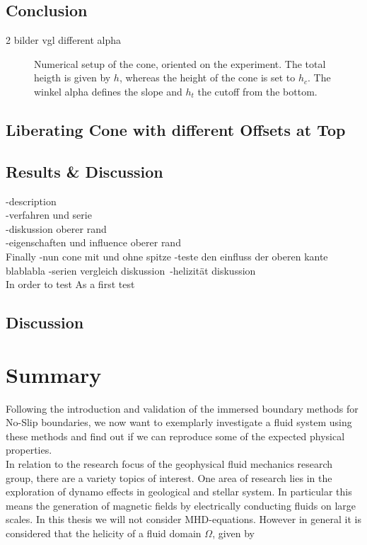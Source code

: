\subsection{Conclusion}
2 bilder vgl different alpha

\begin{figure}[!bp]
      \centering
      \caption{Numerical setup of the cone, oriented on the experiment. The total heigth
         is given by $h$, whereas the height of the cone is set to $h_c$.
      The winkel alpha defines the slope and $h_t$ the cutoff from the bottom.}
      \label{cone:theorie}
\end{figure}


\clearpage

\subsection{Liberating Cone with different Offsets at Top}
\subsection{Results \& Discussion}

-description\\
-verfahren und serie\\
-diskussion oberer rand\\
-eigenschaften und influence oberer rand \\


Finally
-nun cone mit und ohne spitze
-teste den einfluss der oberen kante blablabla
-serien vergleich diskussion\
-helizität diskussion\\

In order to test
As a first test

\subsection{Discussion}


\section{Summary}

Following the introduction and validation of the immersed boundary methods for No-Slip boundaries,
we now want to exemplarly investigate a fluid system using these methods
and find out if we can reproduce some of the expected physical properties.\\
In relation to the research focus of the geophysical fluid mechanics research group, there are a variety
topics of interest.
One area of research lies in the exploration of dynamo effects in geological and stellar system.
In particular this means the generation of magnetic fields by electrically conducting fluids on large scales.
In this thesis we will not consider MHD-equations.
However in general it is considered that the helicity of a fluid domain $\Omega$, given by

